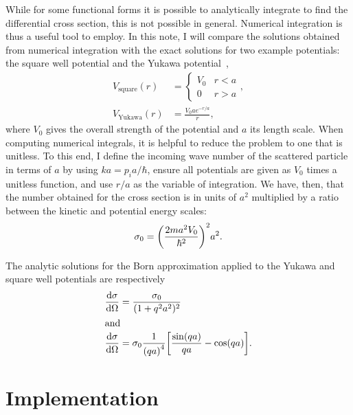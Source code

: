 \documentclass{project}
\begin{document}
While for some functional forms it is possible to analytically integrate to find the differential cross section, this is not possible in general. Numerical integration is thus a useful tool to employ. 
In this note, I will compare the solutions obtained from numerical integration with the exact solutions for two example potentials: the square well potential and the Yukawa potential~\cite{Yukawa:1935xg},
\begin{align} %
  V_{\text{square}}(r) &= \begin{cases} V_0 & r < a \\ 0 & r > a \end{cases}, \\
  V_{\text{Yukawa}}(r) &=  \frac{V_0 a e^{-r/a}}{r},
\end{align}
where $V_0$ gives the overall strength of the potential and $a$ its length scale. When computing numerical integrals, it is helpful to reduce the problem to one that is unitless. To this end, I define the incoming wave number of the scattered particle in terms of $a$ by using $ka = p_i a/\hbar$, ensure all potentials are given as $V_0$ times a unitless function, and use $r/a$ as the variable of integration. We have, then, that the number obtained for the cross section is in units of $a^2$ multiplied by a ratio between the kinetic and potential energy scales:
\begin{equation}
  \sigma_0 = \qty(\frac{2ma^2V_0}{\hbar^2})^2 a^2.
\end{equation}

The analytic solutions for the Born approximation applied to the Yukawa and square well potentials are respectively
\begin{align}
  \dv{\sigma}{\Omega} &= \frac{\sigma_0}{ ( 1 + q^2a^2 )^2 }  \\
  \intertext{and}
  \dv{\sigma}{\Omega} &=\sigma_0 \frac{1}{\qty(qa)^4}  \qty[ \frac{\sin(qa)}{qa} - \cos(qa) ].
\end{align}



\section{Implementation}
\end{document}
